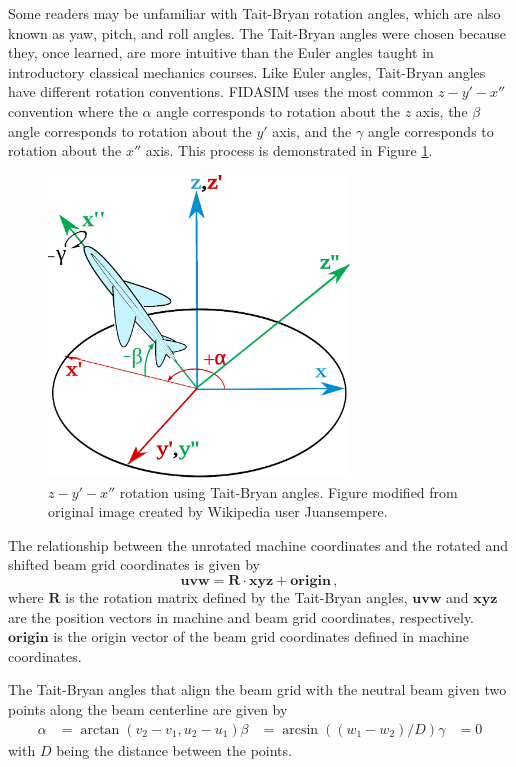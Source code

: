 Some readers may be unfamiliar with Tait-Bryan rotation angles, which are also known as yaw, pitch, and roll angles. The Tait-Bryan angles were chosen because they, once learned, are more intuitive than the Euler angles taught in introductory classical mechanics courses. Like Euler angles, Tait-Bryan angles have different rotation conventions. FIDASIM uses the most common $z-y'-x''$ convention where the $\alpha$ angle corresponds to rotation about the $z$ axis, the $\beta$ angle corresponds to rotation about the $y'$ axis, and the $\gamma$ angle corresponds to rotation about the $x''$ axis. This process is demonstrated in Figure \ref{fig:tait_bryan}.
\begin{figure}[h!]
    \centering
    \includegraphics[width=8cm]{figures/tait_bryan.eps}
    \caption{$z-y'-x''$ rotation using Tait-Bryan angles. Figure modified from original image created by Wikipedia user Juansempere.}
    \label{fig:tait_bryan}
\end{figure}

The relationship between the unrotated machine coordinates and the rotated and shifted beam grid coordinates is given by
\begin{equation}\label{eq:xyz_to_uvw}
    \mathbf{uvw} = \mathbf{R}\cdot \mathbf{xyz} + \mathbf{origin}\,,
\end{equation}
where $\mathbf{R}$ is the rotation matrix defined by the Tait-Bryan angles, $\mathbf{uvw}$ and $\mathbf{xyz}$ are the position vectors in machine and beam grid coordinates, respectively. $\mathbf{origin}$ is the origin vector of the beam grid coordinates defined in machine coordinates.

The Tait-Bryan angles that align the beam grid with the neutral beam given two points along the beam centerline are given by
\begin{equation}
\begin{split}
    \alpha &= \arctan(v_2 - v_1,u_2 - u_1)
    \beta  &= \arcsin((w_1 - w_2)/D)
    \gamma &= 0
\end{split}
\end{equation}
with $D$ being the distance between the points.

